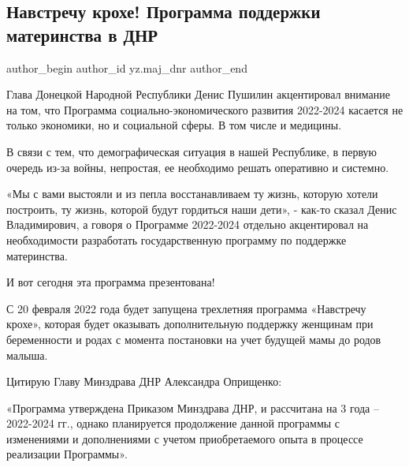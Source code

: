  
 
 
 
 
 
\subsection{Навстречу крохе! Программа поддержки материнства в ДНР}
\label{sec:28_01_2022.yz.maj_dnr.1.materinstvo_kroha}
 
\ifcmt
 author_begin
   author_id yz.maj_dnr
 author_end
\fi

Глава Донецкой Народной Республики Денис Пушилин акцентировал внимание на том,
что Программа социально-экономического развития 2022-2024 касается не только
экономики, но и социальной сферы. В том числе и медицины.

В связи с тем, что демографическая ситуация в нашей Республике, в первую
очередь из-за войны, непростая, ее необходимо решать оперативно и системно.


«Мы с вами выстояли и из пепла восстанавливаем ту жизнь, которую хотели
построить, ту жизнь, которой будут гордиться наши дети», - как-то сказал Денис
Владимирович, а говоря о Программе 2022-2024 отдельно акцентировал на
необходимости разработать государственную программу по поддержке материнства.

И вот сегодня эта программа презентована!

С 20 февраля 2022 года будет запущена трехлетняя программа «Навстречу крохе»,
которая будет оказывать дополнительную поддержку женщинам при беременности и
родах с момента постановки на учет будущей мамы до родов малыша.

Цитирую Главу Минздрава ДНР Александра Оприщенко:

\begin{zznagolos}
«Программа утверждена Приказом Минздрава ДНР, и рассчитана на 3 года –
2022-2024 гг., однако планируется продолжение данной программы с изменениями и
дополнениями с учетом приобретаемого опыта в процессе реализации Программы».	
\end{zznagolos}

